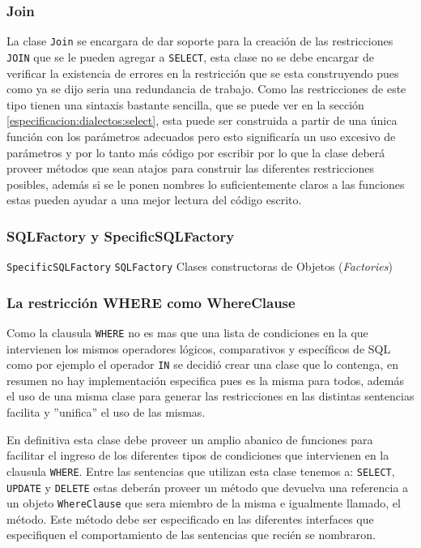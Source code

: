 \subsubsection{Join}
La clase \verb=Join= se encargara de dar soporte para la creación de las restricciones \verb=JOIN= que se le pueden agregar a \verb=SELECT=, esta clase no se debe encargar de verificar la existencia de errores en la restricción que se esta construyendo pues como ya se dijo seria una redundancia de trabajo. Como las restricciones de este tipo tienen una sintaxis bastante sencilla, que se puede ver en la sección \ref{especificacion:dialectos:select}, esta puede ser construida a partir de una única función con los parámetros adecuados pero esto significaría un uso excesivo de parámetros y por lo tanto más código por escribir por lo que la clase deberá proveer métodos que sean atajos para construir las diferentes restricciones posibles, además si se le ponen nombres lo suficientemente claros a las funciones estas pueden ayudar a una mejor lectura del código escrito.
%
\subsubsection{SQLFactory y SpecificSQLFactory}
\verb=SpecificSQLFactory=
\verb=SQLFactory=
Clases constructoras de Objetos (\textit{Factories})
%
\subsubsection{La restricción WHERE como WhereClause}
Como la clausula \verb=WHERE= no es mas que una lista de condiciones en la que intervienen los mismos operadores lógicos, comparativos y específicos de SQL como por ejemplo el operador \verb=IN= se decidió crear una clase que lo contenga, en resumen no hay implementación especifica pues es la misma para todos, además el uso de una misma clase para generar las restricciones en las distintas sentencias facilita y ''unifica'' el uso de las mismas.

En definitiva esta clase debe proveer un amplio abanico de funciones para facilitar el ingreso de los diferentes tipos de condiciones que intervienen en la clausula \verb=WHERE=. Entre las sentencias que utilizan esta clase tenemos a: \verb=SELECT=, \verb=UPDATE= y \verb=DELETE= estas deberán proveer un método que devuelva una referencia a un objeto \verb=WhereClause= que sera miembro de la misma e igualmente llamado, el método. Este método debe ser especificado en las diferentes interfaces que especifiquen el comportamiento de las sentencias que recién se nombraron. 
%

